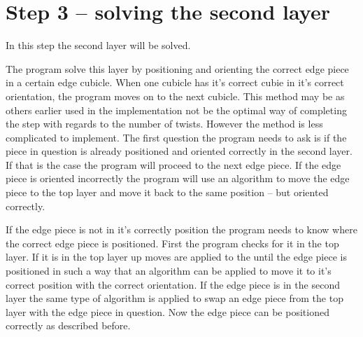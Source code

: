 \section{Step 3 -- solving the second layer}

In this step the second layer will be solved. 

The program solve this layer by positioning and orienting the correct edge piece in a certain edge cubicle. When one cubicle has it's correct cubie in it's correct orientation, the program moves on to the next cubicle. This method may be as others earlier used in the implementation not be the optimal way of completing the step with regards to the number of twists. However the method is less complicated to implement.
The first question the program needs to ask is if the piece in question is already positioned and oriented correctly in the second layer. If that is the case the program will proceed to the next edge piece. If the edge piece is oriented incorrectly the program will use an algorithm to move the edge piece to the top layer and  move it back to the same position -- but oriented correctly. 

If the edge piece is not in it's correctly position the program needs to know where the correct edge piece is positioned. First the program checks for it in the top layer. If it is in the top layer up moves are applied to the \cube{} until the edge piece is positioned in such a way that an algorithm can be applied to move it to it's correct position with the correct orientation. If the edge piece is in the second layer the same type of algorithm is applied to swap an edge piece from the top layer with the edge piece in question. Now the edge piece can be positioned correctly as described before.

